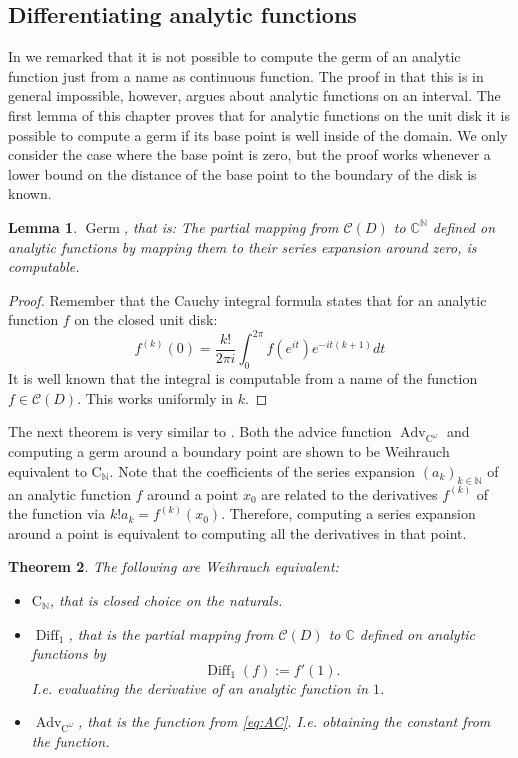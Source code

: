 \documentclass{eptcs-modified}
\newtheorem{theorem}{Theorem}
\newtheorem{lemma}[theorem]{Lemma}
\newcommand{\CCN}{\mathrm{C}_{\NN}}
\newcommand{\C}{\textrm{C}}
\newcommand{\NN}{\mathbb{N}}
\newcommand{\CC}{\mathbb{C}}
\newcommand{\cont}{\mathcal C(D)}
\newcommand{\Advc}{\operatorname{Adv}_{\C^\omega}}
\newcommand{\Diff}{\operatorname{Diff}}
\begin{document}
		\subsection{Differentiating analytic functions}

			In  we remarked that it is not possible to compute the germ of an analytic function just from a name as continuous function.
			The proof in \cite{Muller1995} that this is in general impossible, however, argues about analytic functions on an interval.
			The first lemma of this chapter proves that for analytic functions on the unit disk it is possible to compute a germ if its base point is well inside of the domain.
			We only consider the case where the base point is zero, but the proof works whenever a lower bound on the distance of the base point to the boundary of the disk is known.

			\begin{lemma}\label{lemma:computing germ}
				$\operatorname{Germ}$, that is: The partial mapping from $\cont$ to $\CC^\NN$ defined on analytic functions by mapping them to their series expansion around zero, is computable.
			\end{lemma}

			\begin{proof}
				Remember that the Cauchy integral formula states that for an analytic function $f$ on the closed unit disk:
				\[ f^{(k)}(0) = \frac{k!}{2\pi i} \int_0^{2\pi} f\left(e^{i t}\right)e^{-i t(k+1)} dt \]
				It is well known that the integral is computable from a name of the function $f\in \cont$.
				This works uniformly in $k$.
			\end{proof}

			The next theorem is very similar to .
			Both the advice function $\Advc$ and computing a germ around a boundary point are shown to be Weihrauch equivalent to $\CCN$.
			Note that the coefficients of the series expansion $(a_k)_{k\in\NN}$ of an analytic function $f$ around a point $x_0$ are related to the derivatives $f^{(k)}$ of the function via $k!a_k = f^{(k)}(x_0)$.
			Therefore, computing a series expansion around a point is equivalent to computing all the derivatives in that point.

			\begin{theorem}\label{thm:main functions}
				The following are Weihrauch equivalent:
				\begin{itemize}
					\item \textbf{$\CCN$}, that is closed choice on the naturals.
					\item \textbf{$\Diff_1$}, that is the partial mapping from $\cont$ to $\CC$ defined on analytic functions by
					\[ \Diff_1(f) := f'(1). \]
					I.e. evaluating the derivative of an analytic function in $1$.
					\item \textbf{$\Advc$}, that is the function from \cref{eq:AC}. I.e. obtaining the constant from the function.
				\end{itemize}
			\end{theorem}
\end{document}
